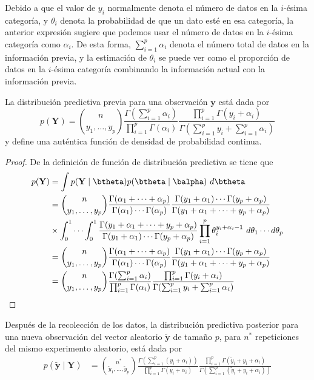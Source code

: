 Debido a que el valor de $y_i$ normalmente denota el número de datos en la $i$-ésima categoría, y $\theta_i$ denota la probabilidad de que un dato esté en esa categoría, la anterior expresión sugiere que podemos usar el número de datos en la $i$-ésima categoría como $\alpha_i$. De esta forma, $\sum_{i=1}^p\alpha_i$ denota el número total de datos en la información previa, y la estimación de $\theta_i$ se puede ver como el proporción de datos en la $i$-ésima categoría combinando la información actual con la información previa.

\begin{Res}
La distribución predictiva previa para una observación $\mathbf{y}$ está dada por
\begin{equation}
p(\mathbf{Y})=\binom{n}{y_1,\ldots,y_p} \frac{\Gamma(\sum_{i=1}^p\alpha_i)}{\prod_{i=1}^p\Gamma(\alpha_i)}
\frac{\prod_{i=1}^p\Gamma(y_i+\alpha_i)}{\Gamma(\sum_{i=1}^py_i+\sum_{i=1}^p\alpha_i)}
\end{equation}
y define una auténtica función de densidad de probabilidad continua.
\end{Res}

\begin{proof}
De la definición de función de distribución predictiva se tiene que
\begin{align*}
p(\mathbf{Y})&=\int p(\mathbf{Y} \mid \btheta)p(\btheta \mid \balpha)\ d\btheta\\
&=\binom{n}{y_1,\ldots,y_p} \frac{\Gamma(\alpha_1+\cdots+\alpha_p)}{\Gamma(\alpha_1)\cdots\Gamma(\alpha_p)}
\frac{\Gamma(y_1+\alpha_1)\cdots\Gamma(y_p+\alpha_p)}{\Gamma(y_1+\alpha_1+\cdots + y_p+\alpha_p)}\\
&\times
\int_0^1 \cdots \int_0^1 \frac{\Gamma(y_1+\alpha_1+\cdots+y_p+\alpha_p)}{\Gamma(y_1+\alpha_1)\cdots\Gamma(y_p+\alpha_p)}
\prod_{i=1}^p\theta_i^{y_i+\alpha_i-1} \ d\theta_1 \cdots d\theta_p\\
&=\binom{n}{y_1,\ldots,y_p} \frac{\Gamma(\alpha_1+\cdots+\alpha_p)}{\Gamma(\alpha_1)\cdots\Gamma(\alpha_p)}
\frac{\Gamma(y_1+\alpha_1)\cdots\Gamma(y_p+\alpha_p)}{\Gamma(y_1+\alpha_1+\cdots + y_p+\alpha_p)}\\
&=\binom{n}{y_1,\ldots,y_p} \frac{\Gamma(\sum_{i=1}^p\alpha_i)}{\prod_{i=1}^p\Gamma(\alpha_i)}
\frac{\prod_{i=1}^p\Gamma(y_i+\alpha_i)}{\Gamma(\sum_{i=1}^py_i+\sum_{i=1}^p\alpha_i)}
\end{align*}
\end{proof}

\begin{Res}
Después de la recolección de los datos, la distribución predictiva posterior para una nueva observación del vector aleatorio $\tilde{\mathbf{y}}$ de tamaño $p$, para $n^*$ repeticiones del mismo experimento aleatorio, está dada por
\begin{align}
p(\tilde{\mathbf{y}} \mid \mathbf{Y})&=
  \binom{n^*}{\tilde{y}_1,\ldots,\tilde{y}_p} \frac{\Gamma(\sum_{i=1}^p(y_i+\alpha_i))}{\prod_{i=1}^p\Gamma(y_i+\alpha_i)}
\frac{\prod_{i=1}^p\Gamma(\tilde{y}_i+y_i+\alpha_i)}{\Gamma(\sum_{i=1}^p(\tilde{y}_i+y_i+\alpha_i))}
\end{align}
\end{Res}

